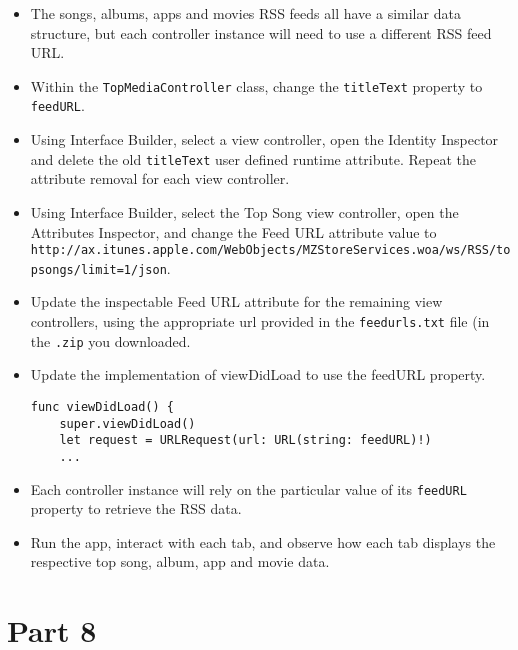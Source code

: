 \documentclass[a4paper,11pt]{scrartcl}
\begin{document}
\begin{itemize}
\item The songs, albums, apps and movies RSS feeds all have a similar data structure, but each controller instance will need to use a different RSS feed URL.
\item Within the \texttt{TopMediaController} class, change the \texttt{titleText} property to \texttt{feedURL}.
\item Using Interface Builder, select a view controller, open the Identity Inspector and delete the old \texttt{titleText} user defined runtime attribute. Repeat the attribute removal for each view controller.
\item Using Interface Builder, select the Top Song view controller, open the Attributes Inspector, and change the Feed URL attribute value to\\ \texttt{http://ax.itunes.apple.com/WebObjects/MZStoreServices.woa/ws/RSS/topsongs/limit=1/json}.
\item Update the inspectable Feed URL attribute for the remaining view controllers, using the appropriate url provided in the \texttt{feedurls.txt} file (in the \texttt{.zip} you downloaded.
\item Update the implementation of viewDidLoad to use the feedURL property.
\begin{lstlisting}
func viewDidLoad() {
	super.viewDidLoad()
	let request = URLRequest(url: URL(string: feedURL)!)
	...
\end{lstlisting}
\item Each controller instance will rely on the particular value of its \texttt{feedURL} property to retrieve the RSS data.
\item Run the app, interact with each tab, and observe how each tab displays the respective top song, album, app and movie data.
\end{itemize}

\section*{Part 8}
\end{document}
